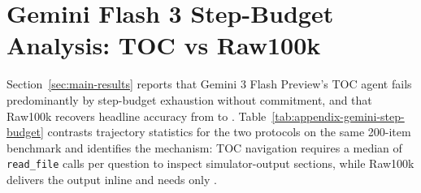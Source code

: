 \documentclass{article}
\begin{document}

\section{Gemini Flash 3 Step-Budget Analysis: TOC vs Raw100k}
\label{sec:appendix-gemini-step-budget}

Section~\ref{sec:main-results} reports that Gemini 3 Flash Preview's TOC agent fails predominantly by step-budget exhaustion without commitment, and that Raw100k recovers headline accuracy from \GeminiThreeFlashTOC{} to \GeminiThreeFlashRaw{}. Table~\ref{tab:appendix-gemini-step-budget} contrasts trajectory statistics for the two protocols on the same 200-item benchmark and identifies the mechanism: TOC navigation requires a median of \GeminiTOCReadFileMedian{} \texttt{read\_file} calls per question to inspect simulator-output sections, while Raw100k delivers the output inline and needs only \GeminiRawReadFileMedian{}.
\end{document}
